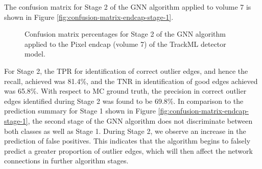 The confusion matrix for Stage 2 of the GNN algorithm applied to volume 7 is shown in Figure \ref{fig:confusion-matrix-endcap-stage-1}.

\begin{figure}[htbp]%
    \centering
    \caption{Confusion matrix percentages for Stage 2 of the GNN algorithm applied to the Pixel endcap (volume 7) of the TrackML detector model.}
    \label{fig:confusion-matrix-endcap-stage-2}
\end{figure}

For Stage 2, the TPR for identification of correct outlier edges, and hence the recall, achieved was 81.4\%, and the TNR in identification of good edges achieved was 65.8\%. With respect to MC ground truth, the precision in correct outlier edges identified during Stage 2 was found to be 69.8\%. In comparison to the prediction summary for Stage 1 shown in Figure \ref{fig:confusion-matrix-endcap-stage-1}, the second stage of the GNN algorithm does not discriminate between both classes as well as Stage 1. During Stage 2, we observe an increase in the prediction of false positives. This indicates that the algorithm begins to falsely predict a greater proportion of outlier edges, which will then affect the network connections in further algorithm stages.






